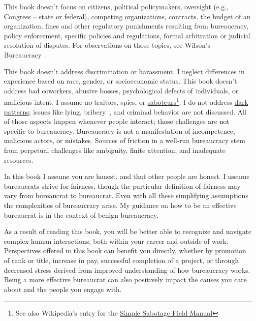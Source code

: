 This book doesn't focus on citizens, political policymakers, oversight (e.g., Congress -- state or federal), competing organizations, contracts, the budget of an organization, fines and other regulatory punishments resulting from bureaucracy, policy enforcement, specific policies and regulations, formal arbitration or judicial resolution of disputes. For observations on those topics, see Wilson's Bureaucracy~\cite{1991_Wilson}. 


This book doesn't address discrimination or harassment. I neglect differences in experience based on race, gender, or socioeconomic status. This book doesn't address bad coworkers, abusive bosses, psychological defects of individuals, or malicious intent. I assume no traitors, spies, or \href{https://www.hsdl.org/?abstract&did=750070}{saboteurs}\footnote{See also Wikipedia's entry for the \href{https://en.wikisource.org/wiki/Simple_Sabotage_Field_Manual}{Simple Sabotage Field Manual}
}.
I do not address \href{https://en.wikipedia.org/wiki/Dark_pattern}{dark patterns}; 
issues like lying, bribery~\cite{2021_Ang}, and criminal behavior are not discussed. All of those aspects happen whenever people interact; those challenges are not specific to bureaucracy. 
Bureaucracy is not a manifestation of incompetence, malicious actors, or mistakes. Sources of friction in a well-run bureaucracy stem from perpetual challenges like ambiguity, finite attention, and inadequate resources.


In this book I assume you are honest, and that other people are honest.  
I assume bureaucrats strive for fairness, though the particular definition of fairness may vary from bureaucrat to bureaucrat. 
Even with all these simplifying assumptions the complexities of bureaucracy arise. My guidance on how to be an effective bureaucrat is in the context of benign bureaucracy.


As a result of reading this book, you will be better able to recognize and navigate complex human interactions, both within your career and outside of work. Perspectives offered in this book can benefit you directly, whether by promotion of rank or title, increase in pay, successful completion of a project, or through decreased stress derived from improved understanding of how bureaucracy works. Being a more effective bureaucrat can also positively impact the causes you care about and the people you engage with.





